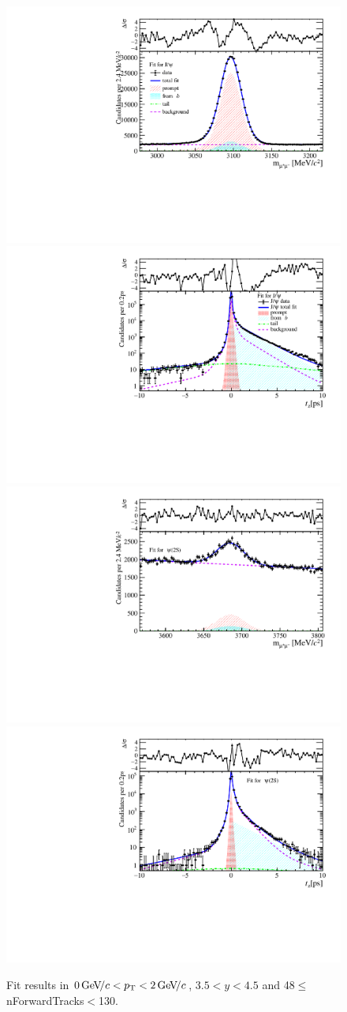 \begin{figure}[H]
\begin{center}
\includegraphics[width=0.47\linewidth]{pdf/Jpsi/drawmassF/n5y3pt1.pdf}
\includegraphics[width=0.47\linewidth]{pdf/Jpsi/2DFitF/n5y3pt1.pdf}
\vspace*{-0.5cm}
\includegraphics[width=0.47\linewidth]{pdf/Psi2S/drawmassF/n5y3pt1.pdf}
\includegraphics[width=0.47\linewidth]{pdf/Psi2S/2DFitF/n5y3pt1.pdf}
\vspace*{-0.5cm}
\end{center}
\caption{Fit results in $0\text{\,Ge\kern -0.1em V\!/}c<p_{\mathrm{T}}<2\text{\,Ge\kern -0.1em V\!/}c$, $3.5<y<4.5$ and 48$\leq$nForwardTracks$<$130.}
\label{Fitn5y3pt1}
\end{figure}
